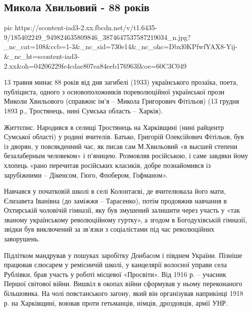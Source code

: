  
 
 
 
 

\subsection{Микола Хвильовий - 88 років}
\label{sec:12_05_2021.fb.kolomiec_jurij.1.hvyljovyj_mykola}


\ifcmt
  pic https://scontent-iad3-2.xx.fbcdn.net/v/t1.6435-9/185402249_949824635809846_3874647537587219034_n.jpg?_nc_cat=108&ccb=1-3&_nc_sid=730e14&_nc_ohc=Dbxl0KPfwfYAX8-Yij-&_nc_ht=scontent-iad3-2.xx&oh=04206229fe4cdae807ea84eeb176963f&oe=60C3C049
\fi


13 травня минає 88 років від дня загибелі (1933) українського прозаїка, поета,
публіциста, одного з основоположників пореволюційної української прози Миколи
Хвильового (справжнє ім'я – Микола Григорович Фітільов) (13 грудня 1893 р.,
Тростянець, нині Сумська область – Харків).

Життєпис. Народився в селищі Тростянець на Харківщині (нині райцентр Сумської
області) у родині вчителів. Батько, Григорій Олексійович Фітільов, був із
дворян, у повсякденний час, як писав сам М.Хвильовий «в высшей степени
безалаберным человеком» і п'яницею. Розмовляв російською, і саме завдяки йому
хлопець «рано перечитав російських класиків, добре познайомився із зарубіжними
– Дікенсом, Гюго, Флобером, Гофманом».

Навчався у початковій школі в селі Колонтаєві, де вчителювала його мати,
Єлизавета Іванівна (до заміжжя – Тарасенко), потім продовжив навчання в
Охтирській чоловічій гімназії, яку був змушений залишити через участь у «так
званому українському революційному гуртку», а згодом в Богодухівській гімназії,
звідки був виключений за зв'язки з соціалістами під час революційних
заворушень.

Підлітком мандрував у пошуках заробітку Донбасом і півднем України. Пізніше
працював слюсарем у ремісничій школі, у канцелярії волосної управи села
Рублівки, брав участь у роботі місцевої «Просвіти». Від 1916 р. – учасник
Першої світової війни. Вишкіл в окопах війни сформував у ньому переконаного
більшовика. На чолі повстанського загону, який він організував наприкінці 1918
р. на Харківщині, воював проти гетьманців, німців, дроздовців, армії УНР.

